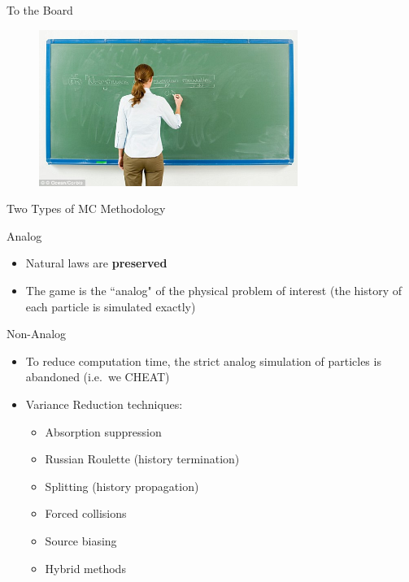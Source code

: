 \documentclass[xcolor=x11names,compress]{beamer}
\renewcommand{\(}{\begin{columns}}
\renewcommand{\)}{\end{columns}}
\newcommand{\<}[1]{\begin{column}{#1}}
\renewcommand{\>}{\end{column}}
\begin{document}
\begin{frame}{To the Board}

  	\begin{figure}
  	\begin{center}
  		\includegraphics[height=2in,clip]{board}
	\end{center}
  	\end{figure}

\end{frame}


\begin{frame}{Two Types of MC Methodology}

\alert{Analog}
\begin{itemize}
    \item Natural laws are \textbf{preserved}
    \item The game is the ``analog" of the physical problem of interest (the history of each particle is simulated exactly)
\end{itemize}
\pause

\alert{Non-Analog}
\begin{itemize}
    \item To reduce computation time, the strict analog simulation of particles is abandoned (i.e.\ we CHEAT)
    \item Variance Reduction techniques:
    \begin{itemize}
    \item Absorption suppression
    \item Russian Roulette (history termination)
    \item Splitting (history propagation)
    \item Forced collisions
    \item Source biasing
    \item Hybrid methods
    \end{itemize}
    \end{itemize}

\end{frame}
\end{document}
